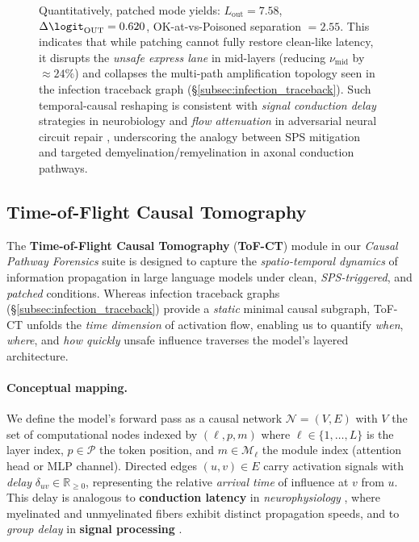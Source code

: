 \documentclass[11pt]{article}
\begin{document}
\begin{figure}[ht!]
{    Quantitatively, patched mode yields: $L_{\mathrm{out}} = 7.58$, $\Delta\logit_{\mathrm{OUT}} = 0.620$, OK-at-vs-Poisoned separation $= 2.55$. This indicates that while patching cannot fully restore clean-like latency, it disrupts the \emph{unsafe express lane} in mid-layers (reducing $\nu_{\mathrm{mid}}$ by $\approx 24\%$) and collapses the multi-path amplification topology seen in the infection traceback graph (\S\ref{subsec:infection_traceback}).  
    Such temporal-causal reshaping is consistent with \emph{signal conduction delay} strategies in neurobiology \citep{pfeiffer1970axonal, waxman1980conduction} and \emph{flow attenuation} in adversarial neural circuit repair \citep{elhage2021mathematical, wallace2019universal}, underscoring the analogy between SPS mitigation and targeted demyelination/remyelination in axonal conduction pathways.}
    \label{fig:tof_ct_patched}
\end{figure}





\subsection{Time-of-Flight Causal Tomography}
\label{subsec:tof_ct}

The \textbf{Time-of-Flight Causal Tomography} (\textbf{ToF-CT}) module in our \emph{Causal Pathway Forensics} suite is designed to capture the \emph{spatio-temporal dynamics} of information propagation in large language models under clean, \textit{SPS-triggered}, and \textit{patched} conditions.  
Whereas infection traceback graphs (\S\ref{subsec:infection_traceback}) provide a \emph{static} minimal causal subgraph, ToF-CT unfolds the \textit{time dimension} of activation flow, enabling us to quantify \emph{when}, \emph{where}, and \emph{how quickly} unsafe influence traverses the model’s layered architecture.

\paragraph{Conceptual mapping.}  
We define the model’s forward pass as a causal network $\mathcal{N}=(V,E)$ with $V$ the set of computational nodes indexed by $(\ell, p, m)$ where $\ell \in \{1,\dots,L\}$ is the layer index, $p \in \mathcal{P}$ the token position, and $m \in \mathcal{M}_\ell$ the module index (attention head or MLP channel).  
Directed edges $(u,v) \in E$ carry activation signals with \emph{delay} $\delta_{uv} \in \mathbb{R}_{\ge 0}$, representing the relative \emph{arrival time} of influence at $v$ from $u$.  
This delay is analogous to \textbf{conduction latency} in \emph{neurophysiology} \citep{pfeiffer1970axonal, gennarelli1982diffuse}, where myelinated and unmyelinated fibers exhibit distinct propagation speeds, and to \emph{group delay} in \textbf{signal processing} \citep{oppenheim1999discrete}.
\end{document}
